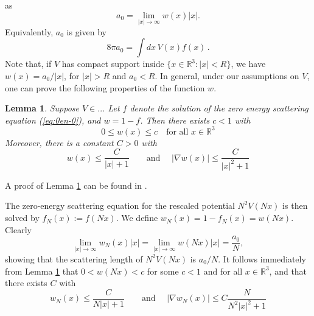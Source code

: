 \documentclass[11pt,a4paper,DIV11]{scrartcl}	%
\newtheorem{lem}[thm]{Lemma}
\newcommand{\bR}{{\mathbb R}}
\newcommand{\ph}{\varphi_t^{(N)}}	%
\begin{document}
as
\[
  a_0 = \lim_{|x| \to \infty} w(x)|x|.
\]
Equivalently, $a_0$ is given by 
\[  8 \pi a_0 = \int dx \, V(x) f(x) \, . \]
Note that, if $V$ has compact support inside $\{ x \in \bR^3 : |x| < R \}$, we have $w(x) = a_0/|x|$, for $|x| > R$ and $a_0 < R$. In general, under our assumptions on $V$, one can prove the following properties of the function $w$.
\begin{lem}\label{lm:w}
Suppose $V \in ..$. Let $f$ denote the solution of the zero energy scattering 
equation (\ref{eq:0en-0}), and $w = 1 - f$. Then there exists $c < 1$ with 
\[ 0 \leq w(x) \leq c \quad \text{for all } x \in \bR^3 \]
Moreover, there is a constant $C>0$ with 
\[ w(x) \leq \frac{C}{|x|+1} \qquad \text{and } \quad  |\nabla w (x)| \leq \frac{C}{|x|^2 + 1} \]
\end{lem}
A proof of Lemma \ref{lm:w} can be found in \cite{ESY2010}.

The zero-energy scattering equation for the rescaled potential $N^2 V (Nx)$ is then solved by $f_N (x) := f (Nx)$. We define $w_N (x) = 1- f_N (x) = w(Nx)$. Clearly 
\[ \lim_{|x| \to \infty} w_N(x) |x| = \lim_{|x| \to \infty} w(Nx) |x| = \frac{a_0}{N} ,\]
showing that the scattering length of $N^2 V(Nx)$ is $a_0/N$. It follows immediately from Lemma \ref{lm:w} that $0 < w(Nx) < c$ for some $c <1$ and for all $x \in \bR^3$, and that there exists $C$ with 
\begin{equation}\label{eq:wN-bd} w_N (x) \leq \frac{C}{N|x| + 1} \qquad \text{and } \quad |\nabla w_N (x)| \leq C \frac{N}{N^2 |x|^2 + 1} \end{equation}

\end{document}
